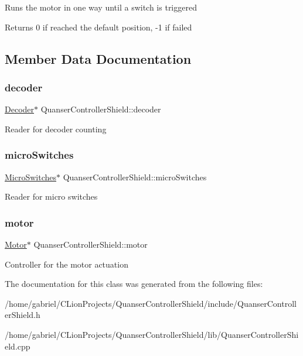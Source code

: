 Runs the motor in one way until a switch is triggered \begin{DoxyReturn}{Returns}
0 if reached the default position, -\/1 if failed 
\end{DoxyReturn}


\subsection{Member Data Documentation}
\mbox{\label{classQuanserControllerShield_a83088510efc04475115e835a65a4b9ad}} 
\subsubsection{\texorpdfstring{decoder}{decoder}}
{\footnotesize\ttfamily \mbox{\hyperlink{classDecoder}{Decoder}}$\ast$ Quanser\+Controller\+Shield\+::decoder}

Reader for decoder counting \mbox{\label{classQuanserControllerShield_a3e52e8fda734c41da7ad6f704ccf0877}} 
\subsubsection{\texorpdfstring{micro\+Switches}{microSwitches}}
{\footnotesize\ttfamily \mbox{\hyperlink{classMicroSwitches}{Micro\+Switches}}$\ast$ Quanser\+Controller\+Shield\+::micro\+Switches}

Reader for micro switches \mbox{\label{classQuanserControllerShield_a7b7642fc075d425ff9ee43909b992f94}} 
\subsubsection{\texorpdfstring{motor}{motor}}
{\footnotesize\ttfamily \mbox{\hyperlink{classMotor}{Motor}}$\ast$ Quanser\+Controller\+Shield\+::motor}

Controller for the motor actuation 

The documentation for this class was generated from the following files\+:\begin{DoxyCompactItemize}
\item 
/home/gabriel/\+C\+Lion\+Projects/\+Quanser\+Controller\+Shield/include/Quanser\+Controller\+Shield.\+h\item 
/home/gabriel/\+C\+Lion\+Projects/\+Quanser\+Controller\+Shield/lib/Quanser\+Controller\+Shield.\+cpp\end{DoxyCompactItemize}

